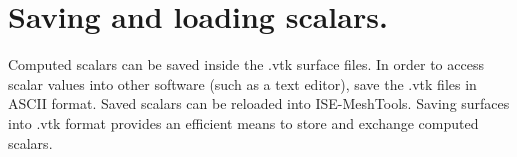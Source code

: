 \section{Saving and loading scalars.}
Computed scalars can be saved inside the .vtk surface files. In order to access scalar values into other software (such as a text editor), save the .vtk files in ASCII format. Saved scalars can be reloaded into ISE-MeshTools. Saving surfaces into .vtk format provides an efficient means to store and exchange
computed scalars.
